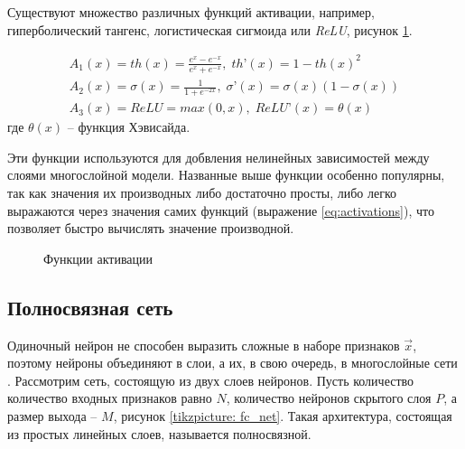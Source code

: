 \indent
\indent
Существуют множество различных функций активации, например, гиперболический
тангенс, логистическая сигмоида или \textit{ReLU}, рисунок \ref{tikzpicture: activations}.

\begin{equation}\label{eq:activations}
	\begin{gathered}
	    A_{1}(x) = th(x) = \frac{e^x - e^{-x}}{e^x + e^{-x}},    \;   th’(x) = {1 - th(x)^2}  \\    
	    A_{2}(x) = \sigma(x) = \frac{1}{1 + e^{-2x}},   \;   \sigma’(x) = \sigma(x)(1 - \sigma(x)) \\
	    A_{3}(x) = ReLU = max(0, x),   \;   ReLU’(x) = \theta(x)
	\end{gathered}
\end{equation}
где $\theta(x)$ -- функция Хэвисайда.

\indent
\indent
Эти функции используются
для добвления нелинейных зависимостей между слоями многослойной модели.
Названные выше функции особенно популярны, 
так как значения их производных либо достаточно просты, либо легко 
выражаются через значения самих функций (выражение \ref{eq:activations}), 
что позволяет быстро вычислять значение производной.

\begin{figure}[h!]
	\begin{center}
	\end{center}
\caption{Функции активации}
\label{tikzpicture: activations}
\end{figure}

\subsection{Полносвязная сеть}

\indent
\indent
Одиночный нейрон не способен выразить сложные в наборе
признаков $\vec{x}$, поэтому нейроны объединяют в слои, а их, в свою 
очередь, в многослойные сети . Рассмотрим сеть,
состоящую из двух слоев нейронов. Пусть количество количество входных признаков
равно $N$, количество нейронов скрытого слоя $P$,
а размер выхода -- $M$, рисунок \ref{tikzpicture: fc_net}. Такая архитектура, 
состоящая из простых линейных слоев, называется полносвязной.
 
